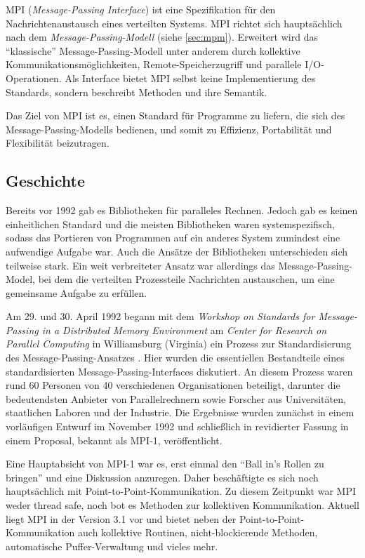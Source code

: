     MPI (\textit{Message-Passing Interface}) ist eine Spezifikation für den Nachrichtenaustausch eines verteilten Systems. MPI richtet sich hauptsächlich nach dem 
    \textit{Message-Passing-Modell} (siehe \autoref{sec:mpm}).
    Erweitert wird das ``klassische'' Message-Passing-Modell unter anderem durch kollektive Kommunikationsmöglichkeiten, Remote-Speicherzugriff und parallele I/O-Operationen.
    Als Interface bietet MPI selbst keine Implementierung des Standards, sondern beschreibt Methoden und ihre Semantik.
    
    Das Ziel von MPI ist es, einen Standard für Programme zu liefern, die sich des Message-Passing-Modells bedienen, und somit zu Effizienz, Portabilität und Flexibilität
    beizutragen. \citep{mpiv31}
    
    \subsection{Geschichte}
      Bereits vor 1992 gab es Bibliotheken für paralleles Rechnen. Jedoch gab es keinen einheitlichen Standard und die meisten Bibliotheken waren systemspezifisch,
      sodass das Portieren von Programmen auf ein anderes System zumindest eine aufwendige Aufgabe war. Auch die Ansätze der Bibliotheken unterschieden sich teilweise
      stark. Ein weit verbreiteter Ansatz war allerdings das Message-Passing-Model, bei dem die verteilten Prozessteile Nachrichten austauschen, um eine gemeinsame
      Aufgabe zu erfüllen.\citep{mpitut}
      
      Am 29. und 30. April 1992 begann mit dem \textit{Workshop on Standards for Message-Passing in a Distributed Memory Environment} am \textit{Center for Research on Parallel 
      Computing} in Williamsburg (Virginia) ein Prozess zur Standardisierung des Message-Passing-Ansatzes \citep{workshop}. Hier wurden die essentiellen Bestandteile eines 
      standardisierten Message-Passing-Interfaces diskutiert. An diesem Prozess waren rund 60 Personen von 40 verschiedenen Organisationen beteiligt, darunter die bedeutendsten
      Anbieter von Parallelrechnern sowie Forscher aus Universitäten, staatlichen Laboren und der Industrie. Die Ergebnisse wurden zunächst in einem vorläufigen Entwurf im
      November 1992 und schließlich in revidierter Fassung in einem Proposal, bekannt als MPI-1, veröffentlicht. \citep{mpi1}
      
      Eine Hauptabsicht von MPI-1 war es, erst einmal den ``Ball in's Rollen zu bringen'' und eine Diskussion anzuregen. Daher beschäftigte es sich noch hauptsächlich
      mit Point-to-Point-Kommunikation. Zu diesem Zeitpunkt war MPI weder thread safe, noch bot es Methoden zur kollektiven Kommunikation. Aktuell liegt MPI in der Version 3.1
      vor und bietet neben der Point-to-Point-Kommunikation auch kollektive Routinen, nicht-blockierende Methoden, automatische Puffer-Verwaltung und vieles mehr. \citep{mpiv31}
      
